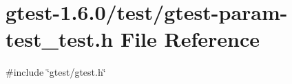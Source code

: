\hypertarget{gtest-param-test__test_8h}{\section{gtest-\/1.6.0/test/gtest-\/param-\/test\-\_\-test.h \-File \-Reference}
\label{d6/d2b/gtest-param-test__test_8h}
}
{\ttfamily \#include \char`\"{}gtest/gtest.\-h\char`\"{}}\*

